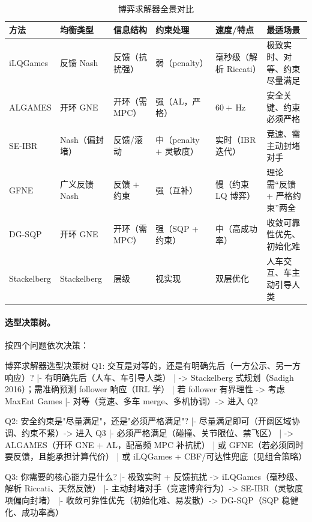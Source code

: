 \begin{table}[H]\centering\small
\caption{博弈求解器全景对比}
\label{tab:rtg-solver-overview}
\begin{tabular}{p{} p{} p{} p{} p{} p{}}
\toprule
方法 & 均衡类型 & 信息结构 & 约束处理 & 速度/特点 & 最适场景 \\
\midrule
iLQGames & 反馈 Nash & 反馈（抗扰强） & 弱（penalty） & 毫秒级（解析 Riccati） & 极致实时、对等、约束尽量满足 \\
ALGAMES & 开环 GNE & 开环（需 MPC） & 强（AL，严格） & $60+$\,Hz & 安全关键、约束必须严格 \\
SE-IBR & Nash（偏封堵） & 反馈/滚动 & 中（penalty + 灵敏度） & 实时（IBR 迭代） & 竞速、需主动封堵对手 \\
GFNE & 广义反馈 Nash & 反馈 + 约束 & 强（互补） & 慢（约束 LQ 博弈） & 理论需“反馈 + 严格约束”两全 \\
DG-SQP & 开环 GNE & 开环（需 MPC） & 强（SQP + 约束） & 中（高成功率） & 收敛可靠性优先、初始化难 \\
Stackelberg & Stackelberg & 层级 & 视实现 & 双层优化 & 人车交互、车主动引导人类 \\
\bottomrule
\end{tabular}
\end{table}

\paragraph{选型决策树。}
按四个问题依次决策：

\begin{codebox}[text]{博弈求解器选型决策树}
Q1: 交互是对等的，还是有明确先后（一方公示、另一方响应）?
 |- 有明确先后（人车、车引导人类）
 |    -> Stackelberg 式规划（Sadigh 2016）；需准确预测 follower 响应（IRL 学）
 |       若 follower 有界理性 -> 考虑 MaxEnt Games
 |- 对等（竞速、多车 merge、多机协调）-> 进入 Q2

Q2: 安全约束是"尽量满足"，还是"必须严格满足"?
 |- 尽量满足即可（开阔区域协调、约束不紧）-> 进入 Q3
 |- 必须严格满足（碰撞、关节限位、禁飞区）
 |    -> ALGAMES（开环 GNE + AL，配高频 MPC 补抗扰）
 |       或 GFNE（若必须同时要反馈，且能承担计算代价）
 |       或 iLQGames + CBF/可达性兜底（见组合策略）

Q3: 你需要的核心能力是什么?
 |- 极致实时 + 反馈抗扰 -> iLQGames（毫秒级、解析 Riccati、天然反馈）
 |- 主动封堵对手（竞速博弈行为）-> SE-IBR（灵敏度项偏向封堵）
 |- 收敛可靠性优先（初始化难、易发散）-> DG-SQP（SQP 稳健化、成功率高）
\end{codebox}

